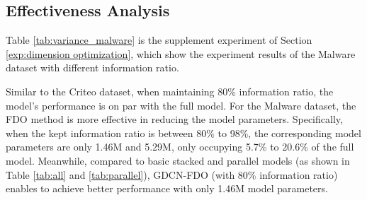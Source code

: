 \documentclass[sigconf]{acmart}
\begin{document}
\subsection{Effectiveness Analysis}
\begin{table}[b]
\centering
\caption{The effectiveness of GCN with FDO approach on the Malware dataset.} 
\label{tab:variance_malware}
\end{table}
Table \ref{tab:variance_malware} is the supplement experiment of Section \ref{exp:dimension optimization}, which show the experiment results of the Malware dataset with different information ratio. 

Similar to the Criteo dataset, when maintaining 80\% information ratio, the model's performance is on par with the full model. For the Malware dataset, the FDO method is more effective in reducing the model parameters. Specifically, when the kept information ratio is between 80\% to 98\%, the corresponding model parameters are only 1.46M and 5.29M, only occupying 5.7\% to 20.6\% of the full model. Meanwhile, compared to basic stacked and parallel models (as shown in Table \ref{tab:all} and \ref{tab:parallel}), GDCN-FDO (with 80\% information ratio) enables to achieve better performance with only 1.46M model parameters. 
\end{document}
